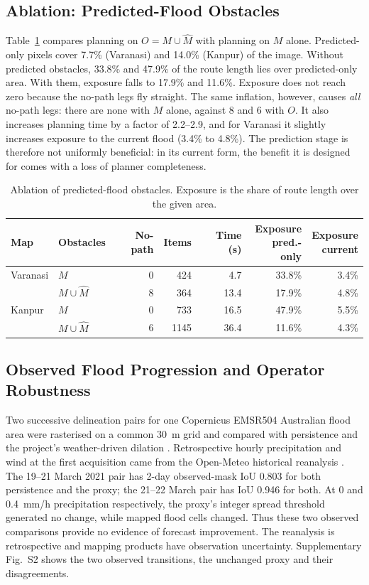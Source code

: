 \subsection{Ablation: Predicted-Flood Obstacles}
Table~\ref{tab:ablation} compares planning on $O=M\cup\hat M$ with planning on $M$ alone. Predicted-only pixels cover 7.7\% (Varanasi) and 14.0\% (Kanpur) of the image. Without predicted obstacles, 33.8\% and 47.9\% of the route length lies over predicted-only area. With them, exposure falls to 17.9\% and 11.6\%. Exposure does not reach zero because the no-path legs fly straight. The same inflation, however, causes \emph{all} no-path legs: there are none with $M$ alone, against 8 and 6 with $O$. It also increases planning time by a factor of 2.2--2.9, and for Varanasi it slightly increases exposure to the current flood (3.4\% to 4.8\%). The prediction stage is therefore not uniformly beneficial: in its current form, the benefit it is designed for comes with a loss of planner completeness.

\begin{table}[t]
\centering
\caption{Ablation of predicted-flood obstacles. Exposure is the share of route length over the given area.}
\label{tab:ablation}
\footnotesize
\setlength{\tabcolsep}{2.4pt}
\begin{tabular}{@{}llrrrrr@{}}
\toprule
Map & Obstacles & No-path & Items & Time (s) & \shortstack{Exposure\\pred.-only} & \shortstack{Exposure\\current}\\
\midrule
Varanasi & $M$ & 0 & 424 & 4.7 & 33.8\% & 3.4\%\\
 & $M\cup\hat M$ & 8 & 364 & 13.4 & 17.9\% & 4.8\%\\
Kanpur & $M$ & 0 & 733 & 16.5 & 47.9\% & 5.5\%\\
 & $M\cup\hat M$ & 6 & 1145 & 36.4 & 11.6\% & 4.3\%\\
\bottomrule
\end{tabular}
\end{table}


\subsection{Observed Flood Progression and Operator Robustness}
Two successive delineation pairs for one Copernicus EMSR504 Australian flood area were rasterised on a common 30~m grid and compared with persistence and the project's weather-driven dilation \cite{cems_emsr504}. Retrospective hourly precipitation and wind at the first acquisition came from the Open-Meteo historical reanalysis \cite{openmeteo_archive}. The 19--21 March 2021 pair has 2-day observed-mask IoU 0.803 for both persistence and the proxy; the 21--22 March pair has IoU 0.946 for both. At 0 and 0.4~mm/h precipitation respectively, the proxy's integer spread threshold generated no change, while mapped flood cells changed. Thus these two observed comparisons provide no evidence of forecast improvement. The reanalysis is retrospective and mapping products have observation uncertainty.
Supplementary Fig.~S2 shows the two observed transitions, the unchanged proxy and their disagreements.


